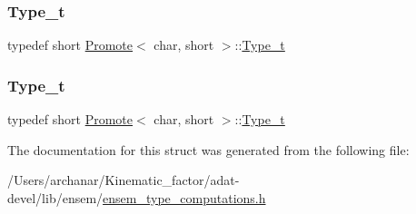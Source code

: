 \subsubsection{\texorpdfstring{Type\_t}{Type\_t}\hspace{0.1cm}{\footnotesize\ttfamily [2/3]}}
{\footnotesize\ttfamily typedef short \mbox{\hyperlink{structPromote}{Promote}}$<$ char, short $>$\+::\mbox{\hyperlink{structPromote_3_01char_00_01short_01_4_a91c7f7533624b9bf6b3e703dee62287a}{Type\+\_\+t}}}

\mbox{\label{structPromote_3_01char_00_01short_01_4_a91c7f7533624b9bf6b3e703dee62287a}} 
\subsubsection{\texorpdfstring{Type\_t}{Type\_t}\hspace{0.1cm}{\footnotesize\ttfamily [3/3]}}
{\footnotesize\ttfamily typedef short \mbox{\hyperlink{structPromote}{Promote}}$<$ char, short $>$\+::\mbox{\hyperlink{structPromote_3_01char_00_01short_01_4_a91c7f7533624b9bf6b3e703dee62287a}{Type\+\_\+t}}}



The documentation for this struct was generated from the following file\+:\begin{DoxyCompactItemize}
\item 
/\+Users/archanar/\+Kinematic\+\_\+factor/adat-\/devel/lib/ensem/\mbox{\hyperlink{adat-devel_2lib_2ensem_2ensem__type__computations_8h}{ensem\+\_\+type\+\_\+computations.\+h}}\end{DoxyCompactItemize}
